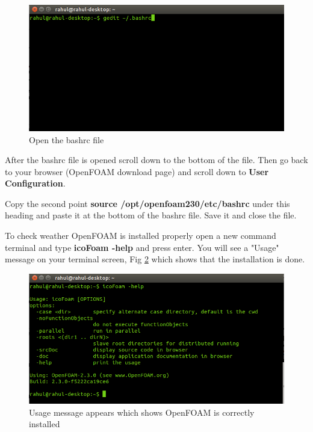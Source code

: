 \documentclass[a4paper,12pt]{report}
\begin{document}
\begin{figure}[ht]  
\begin{center}  
\includegraphics[scale=0.4]{bash.png}
\caption{Open the bashrc file}
\label{terminal}
\end{center}  
\end{figure}

\flushleft After the bashrc file is opened scroll down to the bottom of the file. Then go back to your browser (OpenFOAM download page) and scroll down to \textbf{User Configuration}.  

\flushleft Copy the second point \textbf{source /opt/openfoam230/etc/bashrc} under this heading and paste it at the bottom of the bashrc file. Save it and close the file.

\flushleft To check weather OpenFOAM is installed properly open a new command terminal and type \textbf{icoFoam -help} and press enter. You will see a "Usage" message on your terminal screen, Fig \ref{usage} which shows that the installation is done.

\begin{figure}[ht]  
\begin{center}  
\includegraphics[scale=0.5]{usage.png}
\caption{Usage message appears which shows OpenFOAM is correctly installed}
\label{usage}
\end{center}  
\end{figure}
\end{document}
